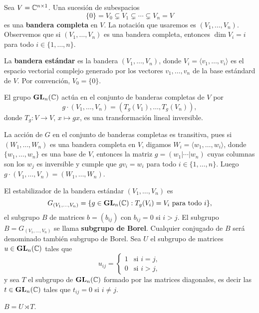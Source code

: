 Sea $V=\mathbb{C}^{n\times 1}$. Una sucesión de subespacios 
\[
\{0\}=V_0\subsetneq V_1\subsetneq \cdots\subsetneq V_n=V
\]
es una \textbf{bandera completa} en $V$. La notación que usaremos es $(V_1,\dots,V_n)$. Observemos
que si $(V_1,\dots,V_n)$ es una bandera completa, entonces $\dim V_i=i$ para todo $i\in\{1,\dots,n\}$. 

La \textbf{bandera estándar} es la bandera $(V_1,\dots,V_n)$, donde
$V_i=\langle v_1,\dots,v_i\rangle$ es el espacio vectorial complejo
generado por los vectores $v_1,\dots,v_n$ de la base estándard de $V$. 
Por convención, $V_0=\{0\}$. 

El grupo $\mathbf{GL}_n(\mathbb{C})$ actúa en el conjunto de banderas completas de $V$ por 
\[
g\cdot (V_1,\dots,V_n)=(T_g(V_1),\dots,T_g(V_n)),
\]
donde $T_g\colon V\to V$, $x\mapsto gx$, es una transformación lineal inversible. 

La acción de $G$ en el conjunto de banderas completas es transitiva, pues
si $(W_1,\dots,W_n)$ es una bandera completa en $V$, digamos
$W_i=\langle w_1,\dots,w_i\rangle$, donde $\{w_1,\dots,w_n\}$ es una base de $V$, entonces 
la matriz $g=(w_1|\cdots|w_n)$ cuyas columnas son los $w_j$ es inversible 
y cumple que
$gv_i=w_i$ para todo $i\in\{1,\dots,n\}$. Luego $g\cdot (V_1,\dots,V_n)=(W_1,\dots,W_n)$. 

El estabilizador de la bandera estándar $(V_1,\dots,V_n)$ es
\[
G_{(V_1,\dots,V_n)}=\{g\in\mathbf{GL}_n(\mathbb{C}):T_g(V_i)=V_i\text{ para todo $i$}\},
\]
el subgrupo $B$ de matrices $b=(b_{ij})$ con $b_{ij}=0$ si $i>j$. 
El subgrupo $B=G_{(V_1,\dots,V_n)}$ se llama \textbf{subgrupo de Borel}.
Cualquier conjugado de $B$ será denominado también subgrupo de Borel. 
Sea $U$ 
el subgrupo de matrices $u\in\mathbf{GL}_n(\mathbb{C})$ tales que 
\[
u_{ij}=\begin{cases}
1 & \text{si $i=j$},\\
0 & \text{si $i>j$},
\end{cases}
\]
y sea $T$ el subgrupo de $\mathbf{GL}_n(\mathbb{C})$ formado por las matrices diagonales, es decir
las $t\in\mathbf{GL}_n(\mathbb{C})$ tales que $t_{ij}=0$ si $i\ne j$. 

\begin{proposition}
$B=U\rtimes T$.	
\end{proposition}

